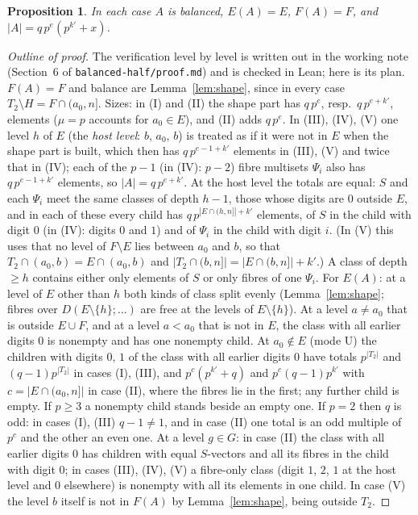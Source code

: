 \documentclass[11pt,a4paper]{amsart}
\newtheorem{proposition}[theorem]{Proposition}
\theoremstyle{definition}
\theoremstyle{remark}
\begin{document}
\begin{proposition}\label{prop:CB}
In each case $A$ is balanced, $E(A)=E$, $F(A)=F$, and $|A|=q\,p^{e}(p^{k'}+x)$.
\end{proposition}
\begin{proof}[Outline of proof]
The verification level by level is written out in the working note (Section~6 of
\texttt{balanced-half/proof.md}) and is checked in Lean; here is its plan. $F(A)=F$ and balance are Lemma~\ref{lem:shape}, since in every case $T_2\setminus H=F\cap(a_0,n]$. Sizes: in
(I) and (II) the shape part has $q\,p^{e}$, resp.\ $q\,p^{e+k'}$, elements ($\mu=p$ accounts for $a_0\in E$),
and (II) adds $q\,p^e$. In (III), (IV), (V) one level $h$ of $E$ (the \emph{host level}: $b$, $a_0$, $b$) is
treated as if it were not in $E$ when the shape part is built, which then has $q\,p^{e-1+k'}$ elements in
(III), (V) and twice that in (IV); each of the $p-1$ (in (IV): $p-2$) fibre multisets $\Psi_i$ also has $q\,p^{e-1+k'}$ elements, so
$|A|=q\,p^{e+k'}$. At the host level the totals are equal: $S$ and each $\Psi_i$ meet the same classes
of depth $h-1$, those whose digits are $0$ outside $E$, and in each of these every child has
$q\,p^{|E\cap(h,n]|+k'}$ elements, of $S$ in the child with digit $0$ (in (IV): digits $0$ and $1$) and
of $\Psi_i$ in the child with digit $i$. (In (V) this uses that no level of $F\setminus E$ lies between
$a_0$ and $b$, so that $T_2\cap(a_0,b)=E\cap(a_0,b)$ and $|T_2\cap(b,n]|=|E\cap(b,n]|+k'$.) A class of depth $\ge h$ contains either only elements of $S$ or only fibres of
one $\Psi_i$. For $E(A)$: at a level of $E$ other than $h$ both kinds of class split evenly
(Lemma~\ref{lem:shape}; fibres over $D(E\setminus\{h\};\dots)$ are free at the levels of $E\setminus\{h\}$).
At a level $a\ne a_0$ that is outside $E\cup F$, and at a level $a<a_0$ that is not in $E$, the class
with all earlier digits $0$ is nonempty and has one nonempty child. At $a_0\notin E$ (mode U) the children with digits $0$, $1$ of the class with all earlier digits $0$ have totals
$p^{|T_2|}$ and $(q-1)p^{|T_2|}$ in cases (I), (III), and $p^{c}(p^{k'}+q)$ and $p^{c}(q-1)p^{k'}$ with
$c=|E\cap(a_0,n]|$ in case (II), where the fibres lie in the first; any further child is empty. If $p\ge3$ a
nonempty child stands beside an empty one. If $p=2$ then $q$ is odd: in cases (I), (III) $q-1\ne1$, and in case
(II) one total is an odd multiple of $p^c$ and the other an even one.
At a level $g\in G$: in case (II) the class with all earlier digits $0$ has children with equal $S$-vectors
and all its fibres in the child with digit $0$; in cases (III), (IV), (V) a fibre-only class (digit $1$, $2$,
$1$ at the host level and $0$ elsewhere) is nonempty with all its elements in one child. In case (V) the
level $b$ itself is not in $F(A)$ by Lemma~\ref{lem:shape}, being outside $T_2$.
\end{proof}
\end{document}

